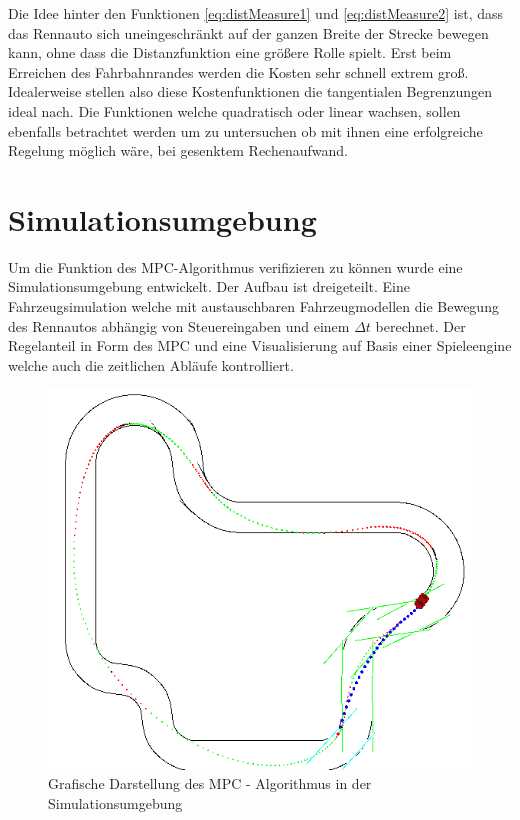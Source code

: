 \documentclass{like}
\begin{document}
Die Idee hinter den Funktionen \ref{eq:distMeasure1} und \ref{eq:distMeasure2} ist, dass das Rennauto sich uneingeschränkt auf der ganzen Breite der Strecke bewegen kann, ohne dass die Distanzfunktion eine größere Rolle spielt. Erst beim Erreichen des Fahrbahnrandes werden die Kosten sehr schnell extrem groß. Idealerweise stellen also diese Kostenfunktionen die tangentialen Begrenzungen ideal nach. Die Funktionen welche quadratisch oder linear wachsen, sollen ebenfalls betrachtet werden um zu untersuchen ob mit ihnen eine erfolgreiche Regelung möglich wäre, bei gesenktem Rechenaufwand. 



\section{Simulationsumgebung}
Um die Funktion des \ac{MPC}-Algorithmus verifizieren zu können wurde eine Simulationsumgebung entwickelt. Der Aufbau ist dreigeteilt. Eine Fahrzeugsimulation welche mit austauschbaren Fahrzeugmodellen die Bewegung des Rennautos abhängig von Steuereingaben und einem $\Delta t$ berechnet. Der Regelanteil in Form des \ac{MPC} und eine Visualisierung auf Basis einer Spieleengine welche auch die zeitlichen Abläufe kontrolliert. 


\begin{figure}[ht!]
	\centering
	\includegraphics[width=350pt]{Abbildungen/sim_visual.png}
	\caption{Grafische Darstellung des MPC - Algorithmus in der Simulationsumgebung}
	\label{fig:jumpDiagram}
\end{figure}
\end{document}
